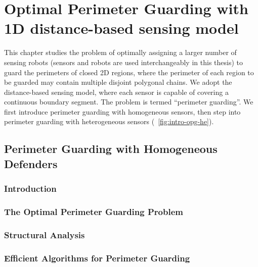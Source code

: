 
\chapter{Optimal Perimeter Guarding with 1D distance-based sensing model}
\thispagestyle{myheadings}

This chapter studies the problem of optimally assigning a larger number of sensing
robots (sensors and robots are used interchangeably in this thesis) to guard the perimeters of closed 2D regions,
where the perimeter of each region to be guarded may contain multiple disjoint polygonal chains.
We adopt the distance-based sensing model, where each sensor is capable of covering a continuous boundary segment.
The problem is termed ``perimeter guarding''.
We first introduce perimeter guarding with homogeneous sensors,
then step into perimeter guarding with heterogeneous sensors (~\ref{fig:intro-opg-he}). 

\section{Perimeter Guarding with Homogeneous Defenders}

\def\R{\mathcal R}
\def\C{\mathcal C}
\def\S{\mathcal S}
\def\P{\mathcal P}
\def\G{\mathcal G}
\def\W{\mathcal W}
\def\opg{{\sc {OPG}}\xspace}

\subsection{Introduction}


\subsection{The Optimal Perimeter Guarding Problem}\label{section:opg-problem}


\subsection{Structural Analysis}\label{section:opg-analysis}


\subsection{Efficient Algorithms for Perimeter Guarding}\label{section:opg-algorithm}


